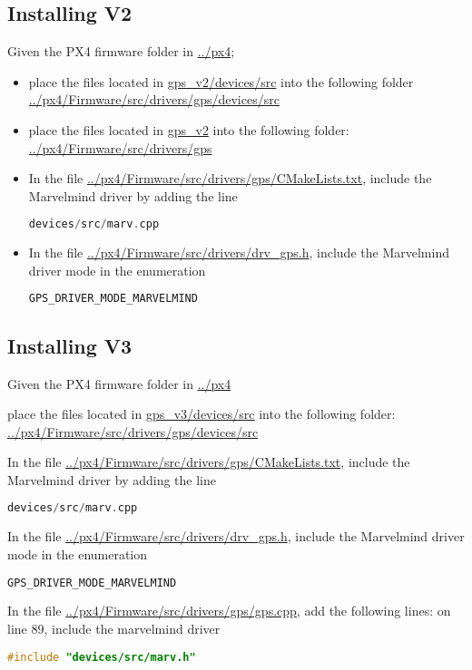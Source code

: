 \subsection{Installing V2}
Given the PX4 firmware folder in \url{../px4};
\begin{itemize}
	\item place the files located in \url{gps\_v2/devices/src} into the following folder \url{../px4/Firmware/src/drivers/gps/devices/src}
	\item place the files located in \url{gps\_v2} into the following folder: \url{../px4/Firmware/src/drivers/gps}
	\item In the file \url{../px4/Firmware/src/drivers/gps/CMakeLists.txt}, include the Marvelmind driver by adding the line \begin{lstlisting}[language=c++]
	devices/src/marv.cpp
	\end{lstlisting}
	\item In the file \url{../px4/Firmware/src/drivers/drv\_gps.h}, include the Marvelmind driver mode in the enumeration
	\begin{lstlisting}[language=c++]
	GPS_DRIVER_MODE_MARVELMIND
	\end{lstlisting}
\end{itemize}
\subsection{Installing V3}
Given the PX4 firmware folder in \url{../px4}

place the files located in \url{gps_v3/devices/src} into the following folder:
\url{../px4/Firmware/src/drivers/gps/devices/src}

In the file \url{../px4/Firmware/src/drivers/gps/CMakeLists.txt}, include the Marvelmind driver by adding the line
\begin{lstlisting}[language=c++]
	devices/src/marv.cpp
\end{lstlisting}


In the file \url{../px4/Firmware/src/drivers/drv_gps.h}, include the Marvelmind driver mode in the enumeration
\begin{lstlisting}[language=c++]
	GPS_DRIVER_MODE_MARVELMIND
\end{lstlisting}


In the file \url{../px4/Firmware/src/drivers/gps/gps.cpp}, add the following lines:
on line 89, include the marvelmind driver
\begin{lstlisting}[language=c++]
	#include "devices/src/marv.h"
\end{lstlisting}

